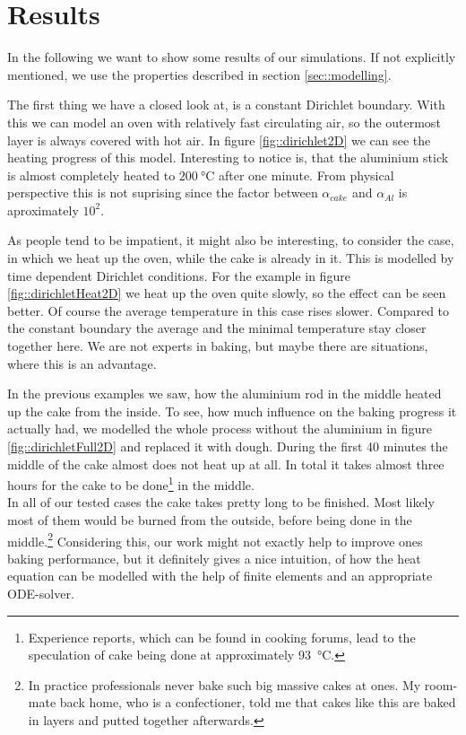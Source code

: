 
\section{\label{sec::results}Results}

In the following we want to show some results of our simulations. If not explicitly mentioned, we use the properties described in section \ref{sec::modelling}.

The first thing we have a closed look at, is a constant Dirichlet boundary. With this we can model an oven with relatively fast circulating air, so the outermost layer is always covered with hot air. In figure \ref{fig::dirichlet2D} we can see the heating progress of this model. Interesting to notice is, that the aluminium stick is almost completely heated to $200\SI{}{\degreeCelsius}$ after one minute. From physical perspective this is not suprising since the factor between $\alpha_{cake}$ and $\alpha_{Al}$ is aproximately $10^2$.

As people tend to be impatient, it might also be interesting, to consider the case, in which we heat up the oven, while the cake is already in it. This is modelled by time dependent Dirichlet conditions. For the example in figure \ref{fig::dirichletHeat2D} we heat up the oven quite slowly, so the effect can be seen better. Of course the average temperature in this case rises slower. Compared to the constant boundary the average and the minimal temperature stay closer together here. We are not experts in baking, but maybe there are situations, where this is an advantage.

In the previous examples we saw, how the aluminium rod in the middle heated up the cake from the inside. To see, how much influence on the baking progress it actually had, we modelled the whole process without the aluminium in figure \ref{fig::dirichletFull2D} and replaced it with dough. During the first 40 minutes the middle of the cake almost does not heat up at all. In total it takes almost three hours for the cake to be done\footnote{Experience reports, which can be found in cooking forums, lead to the speculation of cake being done at approximately 93\SI{}{\degreeCelsius}.} in the middle.\\

In all of our tested cases the cake takes pretty long to be finished. Most likely most of them would be burned from the outside, before being done in the middle.\footnote{In practice professionals never bake such big massive cakes at ones. My room-mate back home, who is a confectioner, told me that cakes like this are baked in layers and putted together afterwards.} Considering this, our work might not exactly help to improve ones baking performance, but it definitely gives a nice intuition, of how the heat equation can be modelled with the help of finite elements and an appropriate ODE-solver.

